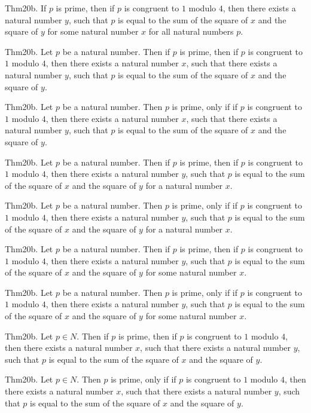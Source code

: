 \documentclass{article}
\begin{document}
Thm20b. If $p$ is prime, then if $p$ is congruent to $1$ modulo $4$, then there exists a natural number $y$, such that $p$ is equal to the sum of the square of $x$ and the square of $y$ for some natural number $x$ for all natural numbers $p$.

Thm20b. Let $p$ be a natural number. Then if $p$ is prime, then if $p$ is congruent to $1$ modulo $4$, then there exists a natural number $x$, such that there exists a natural number $y$, such that $p$ is equal to the sum of the square of $x$ and the square of $y$.

Thm20b. Let $p$ be a natural number. Then $p$ is prime, only if if $p$ is congruent to $1$ modulo $4$, then there exists a natural number $x$, such that there exists a natural number $y$, such that $p$ is equal to the sum of the square of $x$ and the square of $y$.

Thm20b. Let $p$ be a natural number. Then if $p$ is prime, then if $p$ is congruent to $1$ modulo $4$, then there exists a natural number $y$, such that $p$ is equal to the sum of the square of $x$ and the square of $y$ for a natural number $x$.

Thm20b. Let $p$ be a natural number. Then $p$ is prime, only if if $p$ is congruent to $1$ modulo $4$, then there exists a natural number $y$, such that $p$ is equal to the sum of the square of $x$ and the square of $y$ for a natural number $x$.

Thm20b. Let $p$ be a natural number. Then if $p$ is prime, then if $p$ is congruent to $1$ modulo $4$, then there exists a natural number $y$, such that $p$ is equal to the sum of the square of $x$ and the square of $y$ for some natural number $x$.

Thm20b. Let $p$ be a natural number. Then $p$ is prime, only if if $p$ is congruent to $1$ modulo $4$, then there exists a natural number $y$, such that $p$ is equal to the sum of the square of $x$ and the square of $y$ for some natural number $x$.

Thm20b. Let $p \in N$. Then if $p$ is prime, then if $p$ is congruent to $1$ modulo $4$, then there exists a natural number $x$, such that there exists a natural number $y$, such that $p$ is equal to the sum of the square of $x$ and the square of $y$.

Thm20b. Let $p \in N$. Then $p$ is prime, only if if $p$ is congruent to $1$ modulo $4$, then there exists a natural number $x$, such that there exists a natural number $y$, such that $p$ is equal to the sum of the square of $x$ and the square of $y$.
\end{document}
